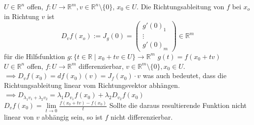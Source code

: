   \(U\in\mathbb{R}^n\) offen, \(f:U\rightarrow \mathbb{R}^m, v\in\mathbb{R}^n\setminus\{0\}\), \(x_0\in U\). Die Richtungsableitung von \(f\) bei \(x_o\) in Richtung \(v\) ist \[D_v f(x_o) := J_g(0)=\begin{pmatrix}g'(0)_1\\\vdots\\g'(0)_m\end{pmatrix}\in\mathbb R^m\] für die Hilfsfunktion \(g : \{t\in\mathbb R\mid x_0 + tv\in U\}\rightarrow \mathbb R ^m\) \(g(t)=f(x_0+tv)\)\\
  \(U\in\mathbb R^n\) offen, \(f:U\rightarrow\mathbb R^m\) differenzierbar, \(v\in\mathbb R^m\setminus\{0\}, x_0\in U\). \\\(\implies D_vf(x_0)=df(x_0)(v)=J_f(x_0)\cdot v\) was auch bedeutet, dass die Richtungsableitung linear vom Richtungsvektor abhängen.\\
  \(\implies D_{\lambda_1v_1+\lambda_2v_2}=\lambda_1D_{v_1}f(x_0)+\lambda_2D_{v_2}f(x_0)\)\\
  \(D_vf(x_0)=\lim\limits_{t\rightarrow0}\frac{f(x_0+tv)-f(x_0)}{t}\) Sollte die
  daraus resultierende Funktion nicht linear von \(v\) abhängig sein, so ist
  \(f\) nicht differenzierbar.
